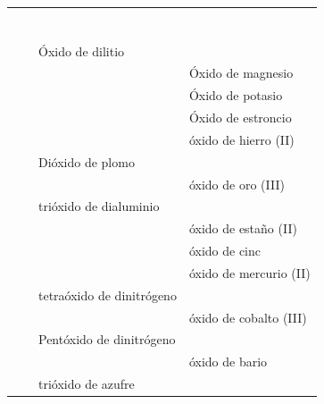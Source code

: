 \begin{landscape}
\begin{longtable}{@{}c C{2cm} C{12cm} C{12cm}@{}}
            \myorder{} &  & \rojo{} & \rojo{} \\[3pt]
            \myorder{} &  & \rojo{} & \rojo{} \\[3pt]
            \myorder{} &  & \rojo{} & \rojo{} \\[3pt]
            \myorder{} &  & \rojo{} & \rojo{} \\[3pt]
            \myorder{} &  & \rojo{} & \rojo{} \\[3pt]
            \myorder{} &  & \rojo{} & \rojo{} \\[3pt]
            \myorder{} &  & \rojo{} & \rojo{} \\[3pt]
            \myorder{} & \rojo{\ch{}} & Óxido de dilitio & \rojo{} \\[3pt]
            \myorder{} & \rojo{\ch{}} & \rojo{} & Óxido de magnesio \\[3pt]
            \myorder{} & \rojo{\ch{}} & \rojo{} & Óxido de potasio \\[3pt]
            \myorder{} & \rojo{\ch{}} & \rojo{} & Óxido de estroncio \\[3pt]
            \myorder{} & \rojo{\ch{}} & \rojo{} & óxido de hierro (II) \\[3pt]
            \myorder{} & \rojo{\ch{}} & Dióxido de plomo & \rojo{} \\[3pt]
            \myorder{} & \rojo{\ch{}} & \rojo{} & óxido de oro (III) \\[3pt]
            \myorder{} & \rojo{\ch{}} & trióxido de dialuminio & \rojo{} \\[3pt]
            \myorder{} & \rojo{\ch{}} & \rojo{} & óxido de estaño (II) \\[3pt]
            \myorder{} & \rojo{\ch{}} & \rojo{} & óxido de cinc \\[3pt]
            \myorder{} & \rojo{\ch{}} & \rojo{} & óxido de mercurio (II) \\[3pt]
            \myorder{} & \rojo{\ch{}} & tetraóxido de dinitrógeno & \rojo{} \\[3pt]
            \myorder{} & \rojo{\ch{}} & \rojo{} & óxido de cobalto (III) \\[3pt]
            \myorder{} & \rojo{\ch{}} & Pentóxido de dinitrógeno & \rojo{} \\[3pt]
            \myorder{} & \rojo{\ch{}} & \rojo{} & óxido de bario \\[3pt]
            \myorder{} & \rojo{\ch{}} & trióxido de azufre & \rojo{} \\[3pt]

\end{longtable}
\end{landscape}
